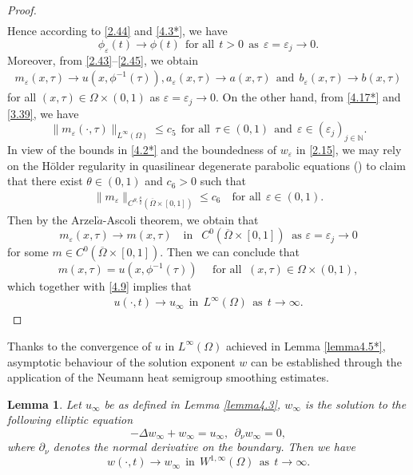 \documentclass[12pt]{article}
\theoremstyle{plain}
\newtheorem{lemma}{Lemma}[section]
\theoremstyle{definition}
\numberwithin{equation}{section}
\begin{document}
\begin{proof}
\begin{align}
\end{align}
Hence according to \eqref{2.44} and \eqref{4.3*}, we have
$$\phi_{\varepsilon}(t)\to\phi(t)~~\mbox{for all}~~t>0~~\mbox{as}~~\varepsilon=\varepsilon_{j}\to 0.$$
Moreover, from \eqref{2.43}--\eqref{2.45}, we obtain
\begin{align}
m_{\varepsilon}(x,\tau)\to u(x,\phi^{-1}(\tau)), a_{\varepsilon}(x,\tau)\to a(x,\tau)~~\mbox{and}~~
b_{\varepsilon}(x,\tau)\to b(x,\tau)
\end{align}
for all $(x,\tau)\in\Omega\times(0,1)$ as $\varepsilon=\varepsilon_{j}\to  0$. On the other hand, from \eqref{4.17*} and \eqref{3.39}, we have
\begin{equation*}
\|m_{\varepsilon}(\cdot,\tau)\|_{L^\infty(\Omega)}\leq c_5~~\mbox{for all}~~\tau\in(0,1)~~\mbox{and}~~\varepsilon\in(\varepsilon_j)_{j\in\mathbb{N}}.
\end{equation*}
In view of the bounds in \eqref{4.2*} and the boundedness of $w_\varepsilon$ in \eqref{2.15}, we may rely on the H\"older regularity in quasilinear degenerate parabolic equations (\cite{Holder}) to claim that there exist $\theta\in(0,1)$ and $c_6>0$ such that
\begin{align}
  \|m_{\varepsilon}\|_{C^{\theta,\frac{\theta}{2}}
  (\overline{\Omega}\times[0,1])}\leq c_6\quad\mbox{for all} ~~\varepsilon\in(0,1).
\end{align}
 Then by the Arzel$\grave{a}$-Ascoli theorem, we obtain that
$$m_{\varepsilon}(x,\tau)\to m(x,\tau)\quad\text{in }\ \ C^{0}\left(\overline{\Omega}\times[0,1]\right)\ \text{ as }\varepsilon=\varepsilon_{j}\to 0$$
for some $m\in C^{0}\left(\overline{\Omega}\times[0,1]\right)$. Then we can conclude that
$$m(x,\tau)=u(x,\phi^{-1}(\tau))\quad\text{ for all }\ (x,\tau)\in\Omega\times(0,1),$$
which together with \eqref{4.9} implies that
\begin{align}
u(\cdot,t)\to u_{\infty}~~\mbox{in}~~L^{\infty}(\Omega)~~\mbox{as}~~t\to\infty.
\end{align}
\end{proof}
Thanks to the convergence of $u$ in $L^{\infty}(\Omega)$ achieved in Lemma \ref{lemma4.5*},  %
asymptotic behaviour of  the solution exponent $w$ %
can be established through the application of the Neumann heat semigroup smoothing estimates.
\begin{lemma}\label{lemma4.5}
Let $u_{\infty}$ be as defined in Lemma \ref{lemma4.3},
$w_{\infty}$ is the solution to the following elliptic equation
\begin{equation}\label{4.15}
-\Delta w_{\infty}+w_{\infty}=u_{\infty},~~\partial_{\nu}w_{\infty}=0,
\end{equation}
where $\partial_{\nu}$ denotes the normal derivative on the boundary. Then we have
\begin{equation}\label{4.16}
w(\cdot,t)\to w_{\infty}~~\mbox{in}~~W^{1,\infty}(\Omega)~~\mbox{as}~~t\to\infty.
\end{equation}
\end{lemma}
\end{document}
